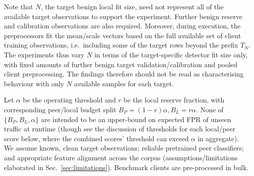 Note that $N$, the target benign local fit size, need not represent all of the available target observations to support the experiment. Further benign reserve and calibration observations are also required. Moreover, during execution, the preprocessors fit the mean/scale vectors based on the full available set of client training observations, i.e.\ including some of the target rows beyond the prefix $T_N$. The experiments thus vary $N$ in terms of the target-specific detector fit size only, with fixed amounts of further benign target validation/calibration and pooled client preprocessing. The findings therefore should not be read as characterising behaviour with only $N$ available samples for each target.

 

Let $\alpha$ be the operating threshold and $r$ be the local reserve fraction, with corresponding peer/local budget split $B_P=(1-r)\alpha, B_L=r\alpha$. None of $\{B_P,B_L,\alpha\}$ are intended to be an upper-bound on expected FPR of unseen traffic at runtime (though see the discussion of thresholds for each local/peer score below, where the combined scores' threshold can exceed $\alpha$ in aggregate). We assume known, clean target observations; reliable pretrained peer classifiers; and appropriate feature alignment across the corpus (assumptions/limitations elaborated in Sec.~\ref{sec:limitations}). Benchmark clients are pre-processed in bulk.